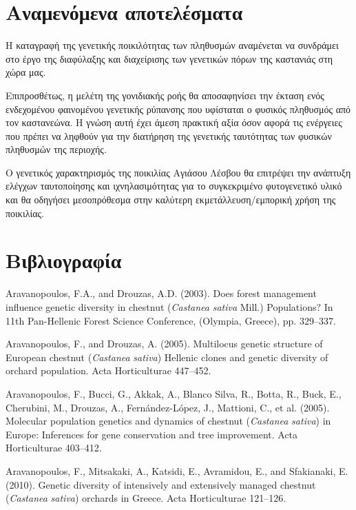 \documentclass[12pt,a4paper,]{report}
\begin{document}
\hypertarget{-}{%
\section{Αναμενόμενα αποτελέσματα}\label{-}}

H καταγραφή της γενετικής ποικιλότητας των πληθυσμών αναμένεται να
συνδράμει στο έργο της διαφύλαξης και διαχείρισης των γενετικών πόρων
της καστανιάς στη χώρα μας.

Επιπροσθέτως, η μελέτη της γονιδιακής ροής θα αποσαφηνίσει την έκταση
ενός ενδεχομένου φαινομένου γενετικής ρύπανσης που υφίσταται ο φυσικός
πληθυσμός από τον καστανεώνα. Η γνώση αυτή έχει άμεση πρακτική αξία όσον
αφορά τις ενέργειες που πρέπει να ληφθούν για την διατήρηση της
γενετικής ταυτότητας των φυσικών πληθυσμών της περιοχής.

Ο γενετικός χαρακτηρισμός της ποικιλίας Αγιάσου Λέσβου θα επιτρέψει την
ανάπτυξη ελέγχων ταυτοποίησης και ιχνηλασιμότητας για το συγκεκριμένο
φυτογενετικό υλικό και θα οδηγήσει μεσοπρόθεσμα στην καλύτερη
εκμετάλλευση/εμπορική χρήση της ποικιλίας.

\section{Βιβλιογραφία}

\hypertarget{refs}{}
\leavevmode\hypertarget{ref-aravanopoulos_does_2003}{}%
Aravanopoulos, F.A., and Drouzas, A.D. (2003). Does forest management
influence genetic diversity in chestnut (\emph{Castanea} \emph{sativa}
Mill.) Populations? In 11th Pan-Hellenic Forest Science Conference,
(Olympia, Greece), pp. 329--337.

\leavevmode\hypertarget{ref-aravanopoulos_multilocus_2005}{}%
Aravanopoulos, F., and Drouzas, A. (2005). Multilocus genetic structure
of European chestnut (\emph{Castanea} \emph{sativa}) Hellenic clones and
genetic diversity of orchard population. Acta Horticulturae 447--452.

\leavevmode\hypertarget{ref-aravanopoulos_molecular_2005}{}%
Aravanopoulos, F., Bucci, G., Akkak, A., Blanco Silva, R., Botta, R.,
Buck, E., Cherubini, M., Drouzas, A., Fernández-López, J., Mattioni, C.,
et al. (2005). Molecular population genetics and dynamics of chestnut
(\emph{Castanea} \emph{sativa}) in Europe: Inferences for gene
conservation and tree improvement. Acta Horticulturae 403--412.

\leavevmode\hypertarget{ref-aravanopoulos_genetic_2010}{}%
Aravanopoulos, F., Mitsakaki, A., Katsidi, E., Avramidou, E., and
Sfakianaki, E. (2010). Genetic diversity of intensively and extensively
managed chestnut (\emph{Castanea} \emph{sativa}) orchards in Greece.
Acta Horticulturae 121--126.
\end{document}
